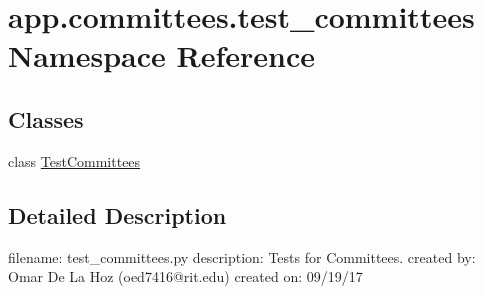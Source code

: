 \hypertarget{namespaceapp_1_1committees_1_1test__committees}{}\section{app.\+committees.\+test\+\_\+committees Namespace Reference}
\label{namespaceapp_1_1committees_1_1test__committees}
\subsection*{Classes}
\begin{DoxyCompactItemize}
\item 
class \mbox{\hyperlink{classapp_1_1committees_1_1test__committees_1_1_test_committees}{Test\+Committees}}
\end{DoxyCompactItemize}


\subsection{Detailed Description}
\begin{DoxyVerb}filename: test_committees.py
description: Tests for Committees.
created by: Omar De La Hoz (oed7416@rit.edu)
created on: 09/19/17
\end{DoxyVerb}
 